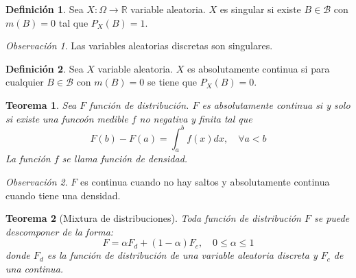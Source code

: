 \documentclass{report}
\newtheorem{theorem}{Teorema}[chapter]
\theoremstyle{remark}
\newtheorem*{remark}{Observación}
\theoremstyle{remark}
\theoremstyle{remark}
\theoremstyle{definition}
\newtheorem{definition}{Definición}[chapter]
\theoremstyle{definition}
\theoremstyle{definition}
\theoremstyle{definition}
\begin{document}
\begin{definition}
    Sea $X: \Omega \to \mathbb{R}$ variable aleatoria.
    $X$ es singular si existe $B \in \mathcal{B}$ con $m(B) = 0$ tal que $P_X(B) = 1$.
\end{definition}

\begin{remark}
    Las variables aleatorias discretas son singulares.
\end{remark}

\begin{definition}
    Sea $X$ variable aleatoria.
    $X$ es absolutamente continua si para cualquier $B \in \mathcal{B}$ con $m(B) = 0$ se tiene que $P_X(B) = 0$.
\end{definition}

\begin{theorem}
    Sea $F$ función de distribución.
    $F$ es absolutamente continua si y solo si existe una funcoón medible $f$ no negativa y finita tal que
    $$F(b) - F(a) = \int_a^b f(x) dx, \quad \forall a < b$$
    La función $f$ se llama función de densidad.
\end{theorem}

\begin{remark}
    $F$ es continua cuando no hay saltos y absolutamente continua cuando tiene una densidad.
\end{remark}

\begin{theorem}[Mixtura de distribuciones]
    Toda función de distribución $F$ se puede descomponer de la forma:
    $$F = \alpha F_d + (1-\alpha)F_c, \quad 0 \leq \alpha \leq 1$$
    donde $F_d$ es la función de distribución de una variable aleatoria discreta y $F_c$ de una continua.
\end{theorem}
\end{document}
